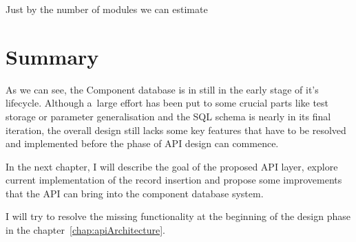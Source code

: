 Just by the number of modules we can estimate

\section{Summary}
\par As we can see, the Component database is in still in the early stage of it's lifecycle. Although a~large effort has been put to some crucial parts like test storage or parameter generalisation and the SQL schema is nearly in its final iteration,  the overall design still lacks some key features that have to be resolved and implemented before the phase of API design can commence.

\par In the next chapter, I will describe the goal of the proposed API layer, explore current implementation of the record insertion and propose some improvements that the API can bring into the component database system. 

\par I will try to resolve the missing functionality at the beginning of the design phase in the chapter~\ref{chap:apiArchitecture}.

